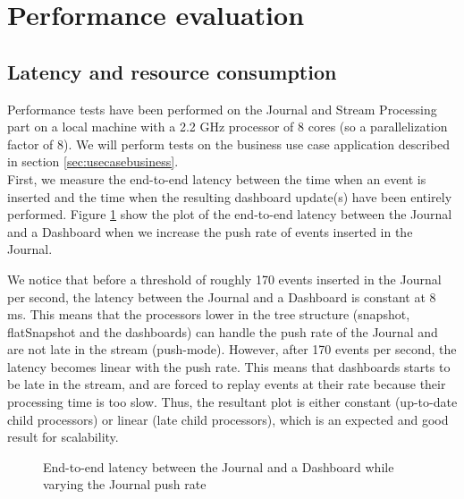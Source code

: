 \section{Performance evaluation}

\subsection{Latency and resource consumption}

Performance tests have been performed on the Journal and Stream Processing part on a local machine with a 2.2 GHz processor of 8 cores (so a parallelization factor of 8). We will perform tests on the business use case application described in section \ref{sec:usecasebusiness}.
\\

First, we measure the end-to-end latency between the time when an event is inserted and the time when the resulting dashboard update(s) have been entirely performed. Figure \ref{fig:latencyplot} show the plot of the end-to-end latency between the Journal and a Dashboard when we increase the push rate of events inserted in the Journal.

We notice that before a threshold of roughly 170 events inserted in the Journal per second, the latency between the Journal and a Dashboard is constant at 8 ms. This means that the processors lower in the tree structure (snapshot, flatSnapshot and the dashboards) can handle the push rate of the Journal and are not late in the stream (push-mode).
However, after 170 events per second, the latency becomes linear with the push rate. This means that dashboards starts to be late in the stream, and are forced to replay events at their rate because their processing time is too slow. Thus, the resultant plot is either constant (up-to-date child processors) or linear (late child processors), which is an expected and good result for scalability.
\\

\begin{figure}[h]
  \begin{center} 
    \caption{End-to-end latency between the Journal and a Dashboard while varying the Journal push rate}
    \label{fig:latencyplot}
  \end{center}
\end{figure}

